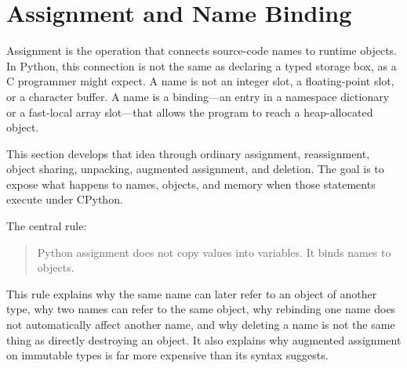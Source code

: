 \section{Assignment and Name Binding}

Assignment is the operation that connects source-code names to runtime objects. In Python, this connection is not the same as declaring a typed storage box, as a C programmer might expect. A name is not an integer slot, a floating-point slot, or a character buffer. A name is a binding---an entry in a namespace dictionary or a fast-local array slot---that allows the program to reach a heap-allocated object.

This section develops that idea through ordinary assignment, reassignment, object sharing, unpacking, augmented assignment, and deletion. The goal is to expose what happens to names, objects, and memory when those statements execute under CPython.

The central rule:

\begin{quote}
Python assignment does not copy values into variables. It binds names to objects.
\end{quote}

This rule explains why the same name can later refer to an object of another type, why two names can refer to the same object, why rebinding one name does not automatically affect another name, and why deleting a name is not the same thing as directly destroying an object. It also explains why augmented assignment on immutable types is far more expensive than its syntax suggests.

